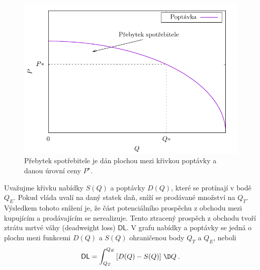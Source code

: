 \begin{figure}[H]
    \centering
    \includegraphics[scale = 0.8]{Gnuplot/Figures/prebytek-spotrebitele-graf.pdf}
    \caption{Přebytek spotřebitele je dán plochou mezi křivkou poptávky a danou úrovní ceny $P^\star$.}
\end{figure}

\begin{example}
    Uvažujme křivku nabídky $S(Q)$ a poptávky $D(Q)$, které se protínají v bodě $Q_E$. Pokud vláda uvalí na daný statek daň, sníží se prodávané množství na $Q_T$. Výsledkem tohoto snížení je, že část potenciálního prospěchu z obchodu mezi kupujícím a prodávajícím se nerealizuje. Tento ztracený prospěch z obchodu tvoří ztrátu mrtvé váhy (deadweight loss) $\mathsf{DL}$. V grafu nabídky a poptávky se jedná o plochu mezi funkcemi $D(Q)$ a $S(Q)$ ohraničenou body $Q_T$ a $Q_E$, neboli \begin{align}
        \mathsf{DL} = \int_{Q_T}^{Q_E} \left[ D(Q) - S(Q) \right] \, \D Q \:.
    \end{align}
\end{example}


